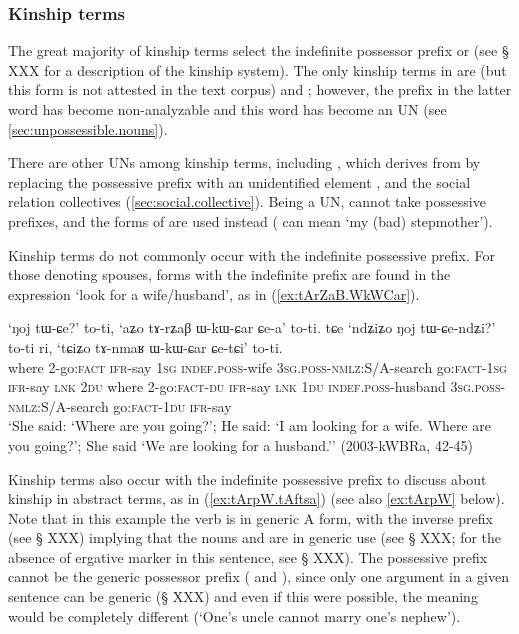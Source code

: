 \subsubsection{Kinship terms} \label{sec:kinship}
The great majority of kinship terms select the indefinite possessor prefix  or  (see § XXX for a description of the kinship system). The only kinship terms in  are  (but this form is not attested in the text corpus) and ; however, the  prefix in the latter word has become non-analyzable and this word has become an UN (see \ref{sec:unpossessible.nouns}). 

There are other UNs among kinship terms, including , which derives from  by replacing the possessive prefix with an unidentified element , and the social relation collectives (\ref{sec:social.collective}). Being a UN,  cannot take possessive prefixes, and the forms of  are used instead ( can mean `my (bad) stepmother').

Kinship terms do not commonly occur with the indefinite possessive prefix. For those denoting spouses, forms with the indefinite prefix are found in the expression `look for a wife/husband', as in (\ref{ex:tArZaB.WkWCar}).
 
\begin{exe}
\ex \label{ex:tArZaB.WkWCar}
 \gll `ŋoj tɯ-ɕe?' to-ti, `aʑo tɤ-rʑaβ ɯ-kɯ-ɕar ɕe-a' to-ti. tɕe `ndʑiʑo ŋoj tɯ-ɕe-ndʑi?' to-ti ri, `tɕiʑo tɤ-nmaʁ ɯ-kɯ-ɕar ɕe-tɕi' to-ti. \\
 where 2-go:\textsc{fact} \textsc{ifr}-say \textsc{1sg} \textsc{indef}.\textsc{poss}-wife \textsc{3sg}.\textsc{poss}-\textsc{nmlz}:S/A-search go:\textsc{fact}-\textsc{1sg} \textsc{ifr}-say \textsc{lnk} \textsc{2du} where 2-go:\textsc{fact}-\textsc{du} \textsc{ifr}-say \textsc{lnk} \textsc{1du} \textsc{indef}.\textsc{poss}-husband  \textsc{3sg}.\textsc{poss}-\textsc{nmlz}:S/A-search go:\textsc{fact}-\textsc{1du} \textsc{ifr}-say  \\
 \glt `She said: `Where are you going?'; He said: `I am looking for a wife. Where are you going?'; She said `We are looking for a husband.'' (2003-kWBRa, 42-45)
\end{exe}

Kinship terms also occur with the indefinite possessive prefix to discuss about kinship in abstract terms, as in (\ref{ex:tArpW.tAftsa}) (see also \ref{ex:tArpW} below). Note that in this example the verb is in generic A form, with the inverse prefix (see § XXX) implying that the nouns  and  are in generic use (see § XXX; for the absence of ergative marker in this sentence, see § XXX). The possessive prefix cannot be the generic possessor prefix  ( and ), since only one argument in a given sentence can be generic (§ XXX) and even if this were possible, the meaning would be completely different (`One's uncle cannot marry one's nephew').


